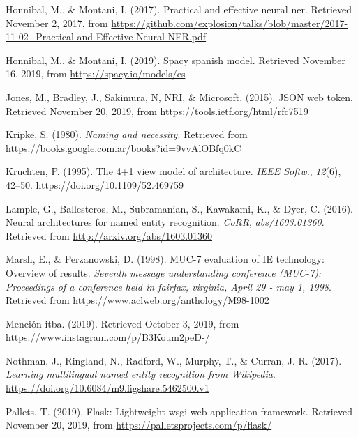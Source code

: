 \documentclass[12pt,a4paper,]{scrartcl}
\begin{document}
\leavevmode\hypertarget{ref-honnibal_NER}{}%
Honnibal, M., \& Montani, I. (2017). Practical and effective neural ner. Retrieved November 2, 2017, from \url{https://github.com/explosion/talks/blob/master/2017-11-02_Practical-and-Effective-Neural-NER.pdf}

\leavevmode\hypertarget{ref-spacy-spanish-model}{}%
Honnibal, M., \& Montani, I. (2019). Spacy spanish model. Retrieved November 16, 2019, from \url{https://spacy.io/models/es}

\leavevmode\hypertarget{ref-JWT}{}%
Jones, M., Bradley, J., Sakimura, N, NRI, \& Microsoft. (2015). JSON web token. Retrieved November 20, 2019, from \url{https://tools.ietf.org/html/rfc7519}

\leavevmode\hypertarget{ref-kripke1980naming}{}%
Kripke, S. (1980). \emph{Naming and necessity}. Retrieved from \url{https://books.google.com.ar/books?id=9vvAlOBfq0kC}

\leavevmode\hypertarget{ref-Kruchten:1995:VMA:624610.625529}{}%
Kruchten, P. (1995). The 4+1 view model of architecture. \emph{IEEE Softw.}, \emph{12}(6), 42--50. \url{https://doi.org/10.1109/52.469759}

\leavevmode\hypertarget{ref-DBLP:journalsux2fcorrux2fLampleBSKD16}{}%
Lample, G., Ballesteros, M., Subramanian, S., Kawakami, K., \& Dyer, C. (2016). Neural architectures for named entity recognition. \emph{CoRR}, \emph{abs/1603.01360}. Retrieved from \url{http://arxiv.org/abs/1603.01360}

\leavevmode\hypertarget{ref-marsh-perzanowski-1998-muc}{}%
Marsh, E., \& Perzanowski, D. (1998). MUC-7 evaluation of IE technology: Overview of results. \emph{Seventh message understanding conference (MUC-7): Proceedings of a conference held in fairfax, virginia, April 29 - may 1, 1998}. Retrieved from \url{https://www.aclweb.org/anthology/M98-1002}

\leavevmode\hypertarget{ref-mediaparty2019_win}{}%
Mención itba. (2019). Retrieved October 3, 2019, from \url{https://www.instagram.com/p/B3Koum2peD-/}

\leavevmode\hypertarget{ref-Nothman2017}{}%
Nothman, J., Ringland, N., Radford, W., Murphy, T., \& Curran, J. R. (2017). \emph{Learning multilingual named entity recognition from Wikipedia}. \url{https://doi.org/10.6084/m9.figshare.5462500.v1}

\leavevmode\hypertarget{ref-flask}{}%
Pallets, T. (2019). Flask: Lightweight wsgi web application framework. Retrieved November 20, 2019, from \url{https://palletsprojects.com/p/flask/}
\end{document}
